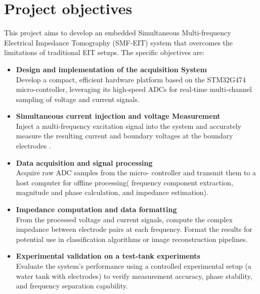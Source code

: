 \section{Project objectives}
This project aims to develop an embedded Simultaneous Multi-frequency Electrical Impedance Tomography (SMF-EIT) system that overcomes the limitations of traditional EIT setups. The specific objectives are:
\begin{itemize}
 
\item \textbf{Design and implementation of the acquisition System}\\
Develop a compact, efficient hardware platform based on the STM32G474 micro-controller, leveraging its high-speed ADCs for real-time multi-channel sampling of voltage and current signals.
\item \textbf{Simultaneous current injection and voltage Measurement}\\
Inject a multi-frequency excitation signal into the system and accurately measure the resulting current and boundary voltages at the boundary electrodes .

\item \textbf{Data acquisition and signal processing}\\
Acquire raw ADC samples from the micro-
controller and transmit them to a host computer for offline processing(
frequency component extraction, magnitude and phase calculation, and
impedance estimation).

\item \textbf{Impedance computation and data formatting}\\
From the processed voltage and current signals, compute the complex impedance between electrode pairs at each frequency. Format the results for potential use in classification algorithms or image reconstruction pipelines.

\item \textbf{Experimental validation on a test-tank experiments}\\
Evaluate the system’s performance using a controlled experimental setup (a water tank with electrodes) to verify measurement accuracy, phase stability, and frequency separation capability.



\end{itemize}

